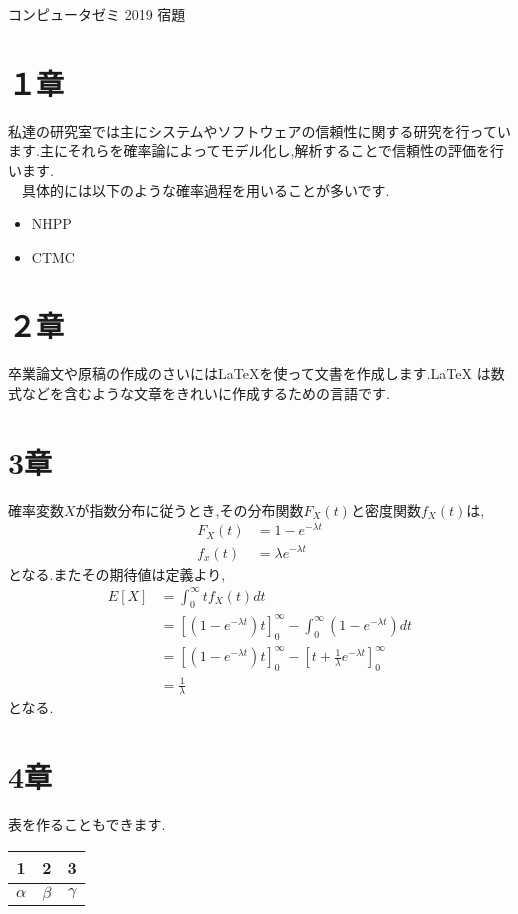\documentclass[a4paper,12pt]{article}
\begin{document}
\begin{center}
{\large コンピュータゼミ 2019 宿題}
\end{center}

\section{１章}
私達の研究室では主にシステムやソフトウェアの信頼性に関する研究を行っています.主にそれらを確率論によってモデル化し,解析することで信頼性の評価を行います.\\
　具体的には以下のような確率過程を用いることが多いです.

\begin{itemize}
    \item NHPP
    \item CTMC
\end{itemize}

\section{２章}
卒業論文や原稿の作成のさいには\LaTeX{}を使って文書を作成します.\LaTeX{} は数式などを含むような文章をきれいに作成するための言語です.

\section{3章}
確率変数$X$が指数分布に従うとき,その分布関数$F_X(t)$と密度関数$f_X(t)$は,
\begin{align}
F_X(t)  &=  1-e^{-\lambda t} \label{F_X} \\
f_x(t)  &=  \lambda e^{-\lambda t}
\end{align}
となる.またその期待値は定義より,
\begin{align}
    E[X] &= \int^{\infty}_0 t f_X(t)dt\nonumber\\
    &= [(1 - e^{-\lambda t})t]^{\infty}_0 - \int^{\infty}_0 (1 - e^{-\lambda t})dt\nonumber\\
    &= [(1 - e^{-\lambda t})t]^{\infty}_0 - [t + \frac{1}{\lambda} e^{-\lambda t}]^{\infty}_0\nonumber\\
    &= \frac{1}{\lambda}
\end{align}
となる.

\section{4章}
表を作ることもできます.\\
\begin{center}
    \begin{tabular}{|c|c|c|}\hline
     1 & 2 & 3 \\\hline
     $\alpha$ & $\beta$ & $\gamma$ \\\hline
    \end{tabular}
\end{center}
\end{document}
